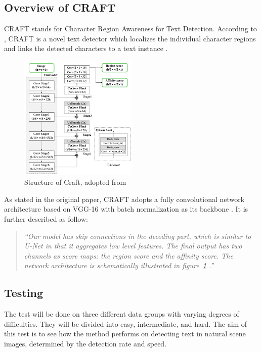 \documentclass[10pt, a4paper]{article}
\begin{document}
\clearpage

\subsection{Overview of CRAFT} %
\label{sub:overviewcraft}
CRAFT stands for Character Region Awareness for Text Detection. According to \cite{CraftBaekEtAl}, CRAFT is a novel text detector which localizes the individual character regions and links the detected characters to a text instance \citep{CraftBaekEtAl}.
\begin{figure}[h!]
	\centering
	\includegraphics[width=0.5\textwidth]{img/craftstructure.png}
	\caption{Structure of Craft, adopted from~\protect\cite{CraftBaekEtAl}}
	\label{fig:craft1}
\end{figure}

As stated in the original paper, CRAFT adopts a fully convolutional network architecture based on VGG-16 \citep{vgg} with batch normalization as its backbone \citep{CraftBaekEtAl}.
It is further described as follow:
\begin{quotation}
	\emph{``Our model has skip connections in the decoding part, which is similar to U-Net \citep{unet} in that it aggregates low level features. The final output has two channels as score maps: the region score and the affinity score.
	The network architecture is schematically illustrated in figure~\ref{fig:craft1} \citep{CraftBaekEtAl}.''}
\end{quotation}

\subsection{Testing} %
\label{sub:testing}
The test will be done on three different data groups with varying degrees of difficulties. They will be divided into easy, intermediate, and hard. The aim of this test is to see how the method performs on detecting text in natural scene images, determined by the detection rate and speed.
\end{document}
